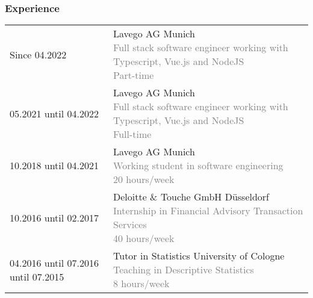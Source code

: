 \subsubsection*{Experience}
\begin{table}[h]
  \begin{tabularx}{\textwidth}{@{}p{4cm}X}

    Since 04.2022 &
    Lavego AG \textbar{} Munich
    \textcolor{gray}{
      \newline Full stack software engineer working with Typescript, Vue.js and NodeJS
      \newline Part-time} \\

    05.2021 until 04.2022 &
    Lavego AG \textbar{} Munich
    \textcolor{gray}{
      \newline Full stack software engineer working with Typescript, Vue.js and NodeJS
      \newline Full-time} \\

    10.2018 until 04.2021 &
    Lavego AG \textbar{} Munich
    \textcolor{gray}{
      \newline Working student in software engineering
      \newline 20 hours/week} \\

    10.2016 until 02.2017 &
    Deloitte \& Touche GmbH \textbar{} Düsseldorf
    \textcolor{gray}{
      \newline Internship in Financial Advisory Transaction Services
      \newline 40 hours/week} \\

    04.2016 until 07.2016 \newline
    10.2014 until 07.2015 &
    Tutor in Statistics \textbar{} University of Cologne
    \textcolor{gray}{
      \newline Teaching in Descriptive Statistics
      \newline 8 hours/week} \\

  \end{tabularx}\label{tab:experience}
\end{table}

\pagebreak
